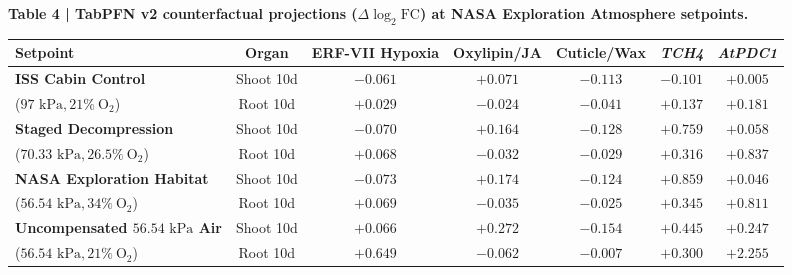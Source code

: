 \documentclass[10pt,a4paper]{article}
\begin{document}
\begin{center}
\small
\textbf{\textsf{Table 4 \;|\; TabPFN v2 counterfactual projections ($\Delta\log_2\text{FC}$) at NASA Exploration Atmosphere setpoints.}}\\[6pt]
\begin{tabular}{lcccccc}
\toprule
\textbf{Setpoint} & \textbf{Organ} & \textbf{ERF-VII Hypoxia} & \textbf{Oxylipin/JA} & \textbf{Cuticle/Wax} & \textit{TCH4} & \textit{AtPDC1} \\
\midrule
\textbf{ISS Cabin Control} & Shoot 10d & $-0.061$ & $+0.071$ & $-0.113$ & $-0.101$ & $+0.005$ \\
($97\text{ kPa}, 21\%\ \text{O}_2$) & Root 10d & $+0.029$ & $-0.024$ & $-0.041$ & $+0.137$ & $+0.181$ \\
\midrule
\textbf{Staged Decompression} & Shoot 10d & $-0.070$ & $+0.164$ & $-0.128$ & $+0.759$ & $+0.058$ \\
($70.33\text{ kPa}, 26.5\%\ \text{O}_2$) & Root 10d & $+0.068$ & $-0.032$ & $-0.029$ & $+0.316$ & $+0.837$ \\
\midrule
\textbf{NASA Exploration Habitat} & Shoot 10d & $-0.073$ & $+0.174$ & $-0.124$ & $+0.859$ & $+0.046$ \\
($56.54\text{ kPa}, 34\%\ \text{O}_2$) & Root 10d & $+0.069$ & $-0.035$ & $-0.025$ & $+0.345$ & $+0.811$ \\
\midrule
\textbf{Uncompensated $56.54\text{ kPa}$ Air} & Shoot 10d & $+0.066$ & $+0.272$ & $-0.154$ & $+0.445$ & $+0.247$ \\
($56.54\text{ kPa}, 21\%\ \text{O}_2$) & Root 10d & $+0.649$ & $-0.062$ & $-0.007$ & $+0.300$ & $+2.255$ \\
\bottomrule
\end{tabular}
\end{center}
\end{document}
